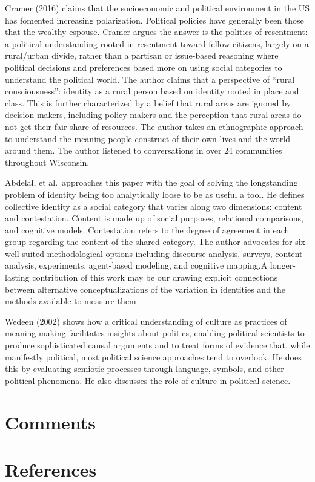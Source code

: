 \documentclass[
  english,
  man]{apa6}
\begin{document}
Cramer (2016) claims that the socioeconomic and political environment in the US has fomented increasing polarization. Political policies have generally been those that the wealthy espouse. Cramer argues the answer is the politics of resentment: a political understanding rooted in resentment toward fellow citizens, largely on a rural/urban divide, rather than a partisan or issue-based reasoning where political decisions and preferences based more on using social categories to understand the political world. The author claims that a perspective of \enquote{rural consciousness}: identity as a rural person based on identity rooted in place and class. This is further characterized by a belief that rural areas are ignored by decision makers, including policy makers and the perception that rural areas do not get their fair share of resources. The author takes an ethnographic approach to understand the meaning people construct of their own lives and the world around them. The author listened to conversations in over 24 communities throughout Wisconsin.

Abdelal, et al.~approaches this paper with the goal of solving the longstanding problem of identity being too analytically loose to be as useful a tool. He defines collective identity as a social category that varies along two dimensions: content and contestation. Content is made up of social purposes, relational comparisons, and cognitive models. Contestation refers to the degree of agreement in each group regarding the content of the shared category. The author advocates for six well-suited methodological options including discourse analysis, surveys, content analysis, experiments, agent-based modeling, and cognitive mapping.A longer-lasting contribution of this work may be our drawing explicit connections between alternative conceptualizations of the variation in identities and the methods available to measure them

Wedeen (2002) shows how a critical understanding of culture as practices of meaning-making facilitates insights about politics, enabling political scientists to produce sophisticated causal arguments and to treat forms of evidence that, while manifestly political, most political science approaches tend to overlook. He does this by evaluating semiotic processes through language, symbols, and other political phenomena. He also discusses the role of culture in political science.

\hypertarget{comments}{%
\section{Comments}\label{comments}}

\newpage

\hypertarget{references}{%
\section{References}\label{references}}

\begingroup
\setlength{\parindent}{-0.5in}
\setlength{\leftskip}{0.5in}

\hypertarget{refs}{}

\endgroup
\end{document}

